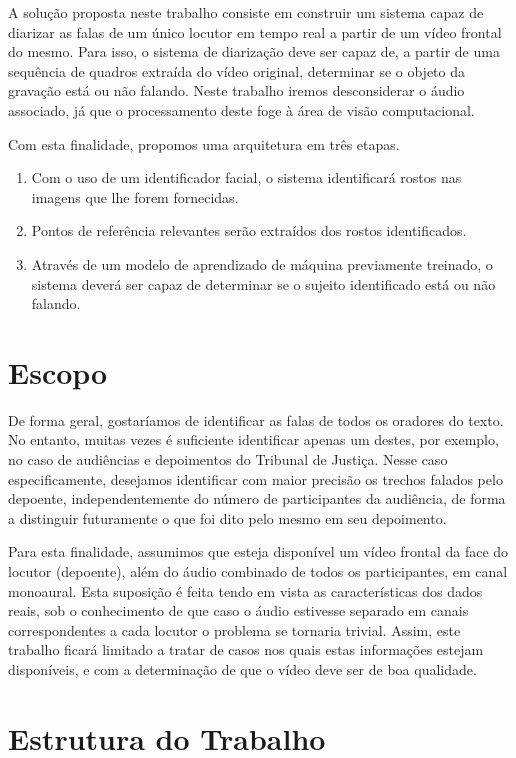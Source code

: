 A solução proposta neste trabalho consiste em construir um sistema capaz de diarizar as falas de um único locutor em tempo real a partir de um vídeo frontal do mesmo.
Para isso, o sistema de diarização deve ser capaz de, a partir de uma sequência de quadros extraída do vídeo original, determinar se o objeto da gravação está ou não falando. Neste trabalho iremos desconsiderar o áudio associado, já que o processamento deste foge à área de visão computacional.

Com esta finalidade, propomos uma arquitetura em três etapas. 
\begin{enumerate}
    \item Com o uso de um identificador facial, o sistema identificará rostos nas imagens que lhe forem fornecidas. 
    \item Pontos de referência relevantes serão extraídos dos rostos identificados. 
    \item Através de um modelo de aprendizado de máquina previamente treinado, o sistema deverá ser capaz de determinar se o sujeito identificado está ou não falando.
\end{enumerate}

\section{Escopo}
\label{sec:scope}

De forma geral, gostaríamos de identificar as falas de todos os oradores do texto.
No entanto, muitas vezes é suficiente identificar apenas um destes, por exemplo, no caso de audiências e depoimentos do Tribunal de Justiça.
Nesse caso especificamente, desejamos identificar com maior precisão os trechos falados pelo depoente, independentemente do número de participantes da audiência, de forma a distinguir futuramente o que foi dito pelo mesmo em seu depoimento.

Para esta finalidade, assumimos que esteja disponível um vídeo frontal da face do locutor (depoente), além do áudio combinado de todos os participantes, em canal monoaural.
Esta suposição é feita tendo em vista as características dos dados reais, sob o conhecimento de que caso o áudio estivesse separado em canais correspondentes a cada locutor o problema se tornaria trivial.
Assim, este trabalho ficará limitado a tratar de casos nos quais estas informações estejam disponíveis, e com a determinação de que o vídeo deve ser de boa qualidade.

\section{Estrutura do Trabalho}
\label{sec:structure}

